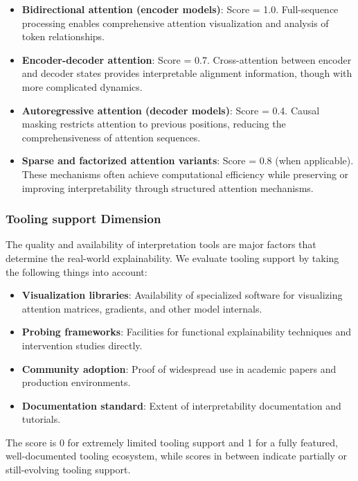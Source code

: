 \documentclass[preprint,12pt]{elsarticle}
\begin{document}
\begin{itemize}
    \item \textbf{Bidirectional attention (encoder models)}: Score = 1.0. Full-sequence processing enables comprehensive attention visualization and analysis of token relationships.

    \item \textbf{Encoder-decoder attention}: Score = 0.7. Cross-attention between encoder and decoder states provides interpretable alignment information, though with more complicated dynamics.

    \item \textbf{Autoregressive attention (decoder models)}: Score = 0.4. Causal masking restricts attention to previous positions, reducing the comprehensiveness of attention sequences.

    \item \textbf{Sparse and factorized attention variants}: Score = 0.8 (when applicable). These mechanisms often achieve computational efficiency while preserving or improving interpretability through structured attention mechanisms.
\end{itemize}

\subsubsection{Tooling support Dimension}
The quality and availability of interpretation tools are major factors that determine the real-world explainability. We evaluate tooling support by taking the following things into account:

\begin{itemize}
   \item \textbf{Visualization libraries}: Availability of specialized software for visualizing attention matrices, gradients, and other model internals.
   
   \item \textbf{Probing frameworks}: Facilities for functional explainability techniques and intervention studies directly.
   
   \item \textbf{Community adoption}: Proof of widespread use in academic papers and production environments.
   
   \item \textbf{Documentation standard}: Extent of interpretability documentation and tutorials.
\end{itemize}

The score is 0 for extremely limited tooling support and 1 for a fully featured, well-documented tooling ecosystem, while scores in between indicate partially or still-evolving tooling support.
\end{document}
